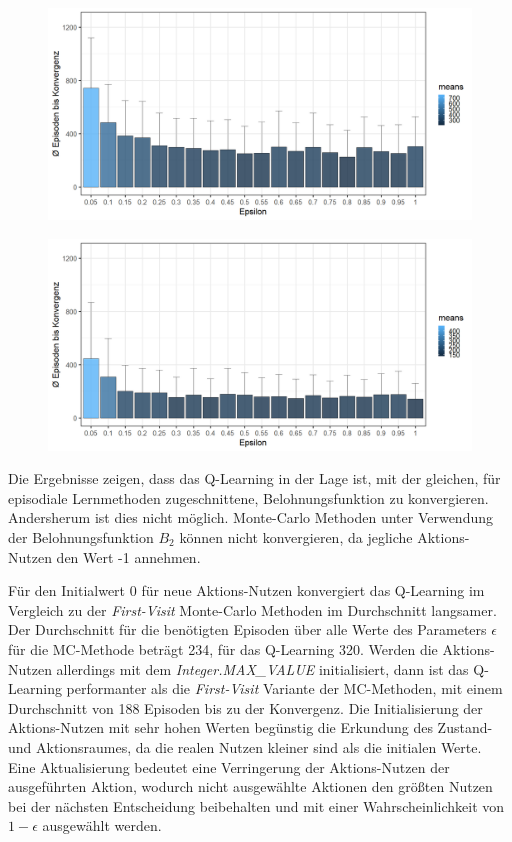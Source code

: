 \begin{figure}[H]
  \centering
  \begin{minipage}{.5\textwidth}
    \centering
    \includegraphics[width=\textwidth]{images/SimpleZ2B1QLearningA}
    \label{fig:test1}
  \end{minipage}%
  \begin{minipage}{.5\textwidth}
    \centering
    \includegraphics[width=\textwidth]{images/SimpleZ2B1QLearningMaxA}
    \label{fig:test2}
  \end{minipage}
\end{figure}
Die Ergebnisse zeigen, dass das Q-Learning in der Lage ist, mit der gleichen, für episodiale Lernmethoden zugeschnittene, Belohnungsfunktion zu konvergieren. Andersherum ist dies nicht möglich. Monte-Carlo Methoden unter Verwendung der Belohnungsfunktion $B_2$ können nicht konvergieren, da jegliche Aktions-Nutzen den Wert -1 annehmen.
\par 
Für den Initialwert 0 für neue Aktions-Nutzen konvergiert das Q-Learning im Vergleich zu der \textit{First-Visit} Monte-Carlo Methoden im Durchschnitt langsamer. Der Durchschnitt für die benötigten Episoden über alle Werte des Parameters $\epsilon$ für die MC-Methode beträgt 234, für das Q-Learning 320. Werden die Aktions-Nutzen allerdings mit dem \textit{Integer.MAX\_VALUE} initialisiert, dann ist das Q-Learning performanter als die \textit{First-Visit} Variante der MC-Methoden, mit einem Durchschnitt von 188 Episoden bis zu der Konvergenz. Die Initialisierung der Aktions-Nutzen mit sehr hohen Werten begünstig die Erkundung des Zustand- und Aktionsraumes, da die realen Nutzen kleiner sind als die initialen Werte. Eine Aktualisierung bedeutet eine Verringerung der Aktions-Nutzen der ausgeführten Aktion, wodurch nicht ausgewählte Aktionen den größten Nutzen bei der nächsten Entscheidung beibehalten und mit einer Wahrscheinlichkeit von $1-\epsilon$ ausgewählt werden.
